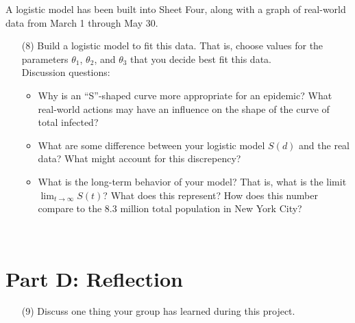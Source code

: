 \documentclass[11pt,reqno,final]{amsart}
\numberwithin{equation}{section}
\numberwithin{figure}{section}
\theoremstyle{definition} %
\newcommand{\dlim}{\displaystyle\lim}
\begin{document}
A logistic model has been built into \textcolor{OliveGreen}{Sheet Four}, along with a graph of real-world data from \textcolor{OliveGreen}{March 1 through May 30}.
\begin{enumerate}
\item[(8)] Build a logistic model to fit this data.
        That is, choose values for the parameters $\theta_1$, $\theta_2$, and $\theta_3$ that you decide best fit this data.\\
        
        Discussion questions:
        \begin{itemize}
        \item Why is an ``S''-shaped curve more appropriate for an epidemic? What real-world actions may have an influence on the shape of the curve of total infected?
        \item What are some difference between your logistic model $S(d)$ and the real data? What might account for this discrepency?
        \item What is the long-term behavior of your model? That is, what is the limit $\dlim_{t \to \infty}S(t)$? What does this represent? How does this number compare to the 8.3 million total population in New York City?
        \end{itemize}
\end{enumerate}

$ $

\section*{Part D: Reflection}

\begin{enumerate}
\item[(9)] Discuss one thing your group has learned during this project.
\end{enumerate}
\end{document}
